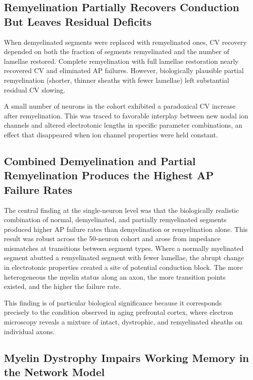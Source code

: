 \documentclass[11pt]{article}
\begin{document}
\subsection{Remyelination Partially Recovers Conduction But Leaves Residual Deficits}

When demyelinated segments were replaced with remyelinated ones, CV recovery depended on both the fraction of segments remyelinated and the number of lamellae restored. Complete remyelination with full lamellae restoration nearly recovered CV and eliminated AP failures. However, biologically plausible partial remyelination (shorter, thinner sheaths with fewer lamellae) left substantial residual CV slowing.

A small number of neurons in the cohort exhibited a paradoxical CV increase after remyelination. This was traced to favorable interplay between new nodal ion channels and altered electrotonic lengths in specific parameter combinations, an effect that disappeared when ion channel properties were held constant.

\subsection{Combined Demyelination and Partial Remyelination Produces the Highest AP Failure Rates}

The central finding at the single-neuron level was that the biologically realistic combination of normal, demyelinated, and partially remyelinated segments produced higher AP failure rates than demyelination or remyelination alone. This result was robust across the 50-neuron cohort and arose from impedance mismatches at transitions between segment types. Where a normally myelinated segment abutted a remyelinated segment with fewer lamellae, the abrupt change in electrotonic properties created a site of potential conduction block. The more heterogeneous the myelin status along an axon, the more transition points existed, and the higher the failure rate.

This finding is of particular biological significance because it corresponds precisely to the condition observed in aging prefrontal cortex, where electron microscopy reveals a mixture of intact, dystrophic, and remyelinated sheaths on individual axons.

\subsection{Myelin Dystrophy Impairs Working Memory in the Network Model}
\end{document}
